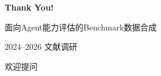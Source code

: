 \documentclass[aspectratio=169, 11pt]{beamer}
\begin{document}
\begin{frame}[plain]
\vfill
\begin{center}
{\Huge\bfseries\color{mainblue} Thank You!}

\vspace{20pt}
{\large 面向Agent能力评估的Benchmark数据合成}

\vspace{6pt}
{\normalsize 2024--2026 文献调研}

\vspace{24pt}
{\Large 欢迎提问}
\end{center}
\vfill
\end{frame}
\end{document}
